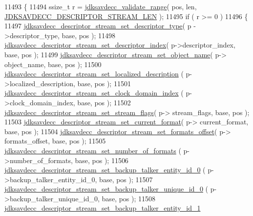 \begin{DoxyCode}
11493 \{
11494     ssize\_t r = \hyperlink{group__util_ga9c02bdfe76c69163647c3196db7a73a1}{jdksavdecc\_validate\_range}( pos, len, 
      \hyperlink{group__descriptor__stream_gacaa7489d625d3c733ab8813b5fb7dbe5}{JDKSAVDECC\_DESCRIPTOR\_STREAM\_LEN} );
11495     \textcolor{keywordflow}{if} ( r >= 0 )
11496     \{
11497         \hyperlink{group__descriptor__stream_ga918e6b024130733321f895e97194daf2}{jdksavdecc\_descriptor\_stream\_set\_descriptor\_type}( p
      ->descriptor\_type, base, pos );
11498         \hyperlink{group__descriptor__stream_ga868f3db0eb21a454419a20eb8c34c67f}{jdksavdecc\_descriptor\_stream\_set\_descriptor\_index}(
       p->descriptor\_index, base, pos );
11499         \hyperlink{group__descriptor__stream_gab43bc6658692233e8d19edca16d8e29d}{jdksavdecc\_descriptor\_stream\_set\_object\_name}( p->
      object\_name, base, pos );
11500         \hyperlink{group__descriptor__stream_ga3a0276f53697e44d0770eebf7e1be3e8}{jdksavdecc\_descriptor\_stream\_set\_localized\_description}
      ( p->localized\_description, base, pos );
11501         \hyperlink{group__descriptor__stream_gabeafb7a311be79625c500a535220ccc2}{jdksavdecc\_descriptor\_stream\_set\_clock\_domain\_index}
      ( p->clock\_domain\_index, base, pos );
11502         \hyperlink{group__descriptor__stream_ga0752cfc3c3e9c2defcd83188ec7fd667}{jdksavdecc\_descriptor\_stream\_set\_stream\_flags}( p->
      stream\_flags, base, pos );
11503         \hyperlink{group__descriptor__stream_ga548deb717063430826d2498e6329e06f}{jdksavdecc\_descriptor\_stream\_set\_current\_format}( p->
      current\_format, base, pos );
11504         \hyperlink{group__descriptor__stream_gaaaa49480b22af710f7ac55f2f6606498}{jdksavdecc\_descriptor\_stream\_set\_formats\_offset}( p->
      formats\_offset, base, pos );
11505         \hyperlink{group__descriptor__stream_gadb9f7058fad2be3ddcc10cad56fa8c4a}{jdksavdecc\_descriptor\_stream\_set\_number\_of\_formats}
      ( p->number\_of\_formats, base, pos );
11506         \hyperlink{group__descriptor__stream_ga52a9a2d2f656ef1d073fe1bbf36ac7f4}{jdksavdecc\_descriptor\_stream\_set\_backup\_talker\_entity\_id\_0}
      ( p->backup\_talker\_entity\_id\_0, base, pos );
11507         \hyperlink{group__descriptor__stream_gaa4fb1cb911eabfb874c2806898b0818e}{jdksavdecc\_descriptor\_stream\_set\_backup\_talker\_unique\_id\_0}
      ( p->backup\_talker\_unique\_id\_0, base, pos );
11508         \hyperlink{group__descriptor__stream_ga6488ba2f367c22d29e205a88c65225f1}{jdksavdecc\_descriptor\_stream\_set\_backup\_talker\_entity\_id\_1}

\end{DoxyCode}
